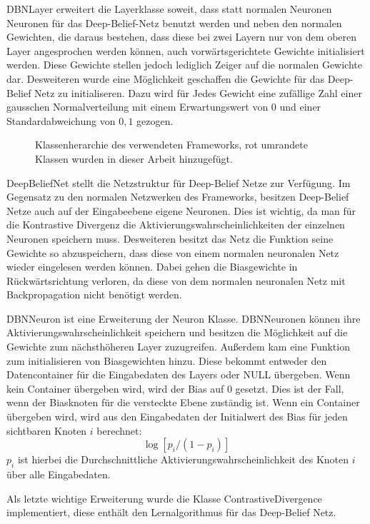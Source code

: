 \documentclass[12pt]{article}
\begin{document}
DBNLayer erweitert die Layerklasse soweit, dass statt normalen Neuronen Neuronen für das Deep-Belief-Netz benutzt werden und neben den normalen Gewichten, die daraus bestehen, dass diese bei zwei Layern nur von dem oberen Layer angesprochen werden können, auch vorwärtsgerichtete Gewichte initialisiert werden. Diese Gewichte stellen jedoch lediglich Zeiger auf die normalen Gewichte dar. Desweiteren wurde eine Möglichkeit geschaffen die Gewichte für das Deep-Belief Netz zu initialiseren. Dazu wird für Jedes Gewicht eine zufällige Zahl einer gausschen Normalverteilung mit einem Erwartungswert von 0 und einer Standardabweichung von $0,1$ gezogen.
\begin{figure}[H]
	\center
	
	\caption{Klassenherarchie des verwendeten Frameworks, rot umrandete Klassen wurden in dieser Arbeit hinzugefügt.}
	\label{Aufbau}
\end{figure}
DeepBeliefNet stellt die Netzstruktur für Deep-Belief Netze zur Verfügung. Im Gegensatz zu den normalen Netzwerken des Frameworks, besitzen Deep-Belief Netze auch auf der Eingabeebene eigene Neuronen. Dies ist wichtig, da man für die Kontrastive Divergenz die Aktivierungswahrscheinlichkeiten der einzelnen Neuronen speichern muss. Desweiteren besitzt das Netz die Funktion seine Gewichte so abzuspeichern, dass diese von einem normalen neuronalen Netz wieder eingelesen werden können. Dabei gehen die Biasgewichte in Rückwärtsrichtung verloren, da diese von dem normalen neuronalen Netz mit Backpropagation nicht benötigt werden.

DBNNeuron ist eine Erweiterung der Neuron Klasse. DBNNeuronen können ihre Aktivierungswahrscheinlichkeit speichern und besitzen die Möglichkeit auf die Gewichte zum nächsthöheren Layer zuzugreifen. Außerdem kam eine Funktion zum initialisieren von Biasgewichten hinzu. Diese bekommt entweder den Datencontainer für die Eingabedaten des Layers oder NULL übergeben. Wenn kein Container übergeben wird, wird der Bias auf 0 gesetzt. Dies ist der Fall, wenn der Biasknoten für die versteckte Ebene zuständig ist. Wenn ein Container übergeben wird, wird aus den Eingabedaten der Initialwert des Bias für jeden sichtbaren Knoten $i$ berechnet:
\begin{equation}
\log [p_i/(1-p_i)]
\end{equation}
$p_i$ ist hierbei die Durchschnittliche Aktivierungswahrscheinlichkeit des Knoten $i$ über alle Eingabedaten.

Als letzte wichtige Erweiterung wurde die Klasse ContrastiveDivergence implementiert, diese enthält den Lernalgorithmus für das Deep-Belief Netz.
\end{document}
